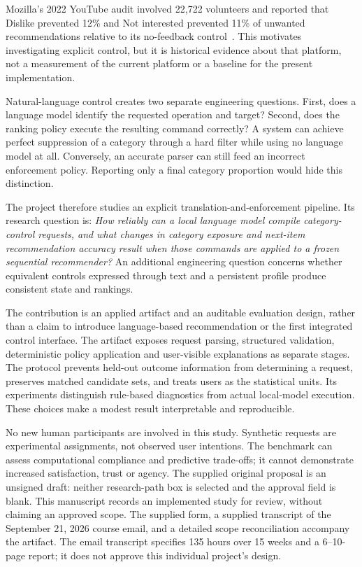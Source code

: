 \documentclass[conference]{IEEEtran}
\begin{document}
Mozilla's 2022 YouTube audit involved 22,722 volunteers and reported that Dislike prevented 12\% and Not interested prevented 11\% of unwanted recommendations relative to its no-feedback control~\cite{ricks2022button}. This motivates investigating explicit control, but it is historical evidence about that platform, not a measurement of the current platform or a baseline for the present implementation.

Natural-language control creates two separate engineering questions. First, does a language model identify the requested operation and target? Second, does the ranking policy execute the resulting command correctly? A system can achieve perfect suppression of a category through a hard filter while using no language model at all. Conversely, an accurate parser can still feed an incorrect enforcement policy. Reporting only a final category proportion would hide this distinction.

The project therefore studies an explicit translation-and-enforcement pipeline. Its research question is: \emph{How reliably can a local language model compile category-control requests, and what changes in category exposure and next-item recommendation accuracy result when those commands are applied to a frozen sequential recommender?} An additional engineering question concerns whether equivalent controls expressed through text and a persistent profile produce consistent state and rankings.

The contribution is an applied artifact and an auditable evaluation design, rather than a claim to introduce language-based recommendation or the first integrated control interface. The artifact exposes request parsing, structured validation, deterministic policy application and user-visible explanations as separate stages. The protocol prevents held-out outcome information from determining a request, preserves matched candidate sets, and treats users as the statistical units. Its experiments distinguish rule-based diagnostics from actual local-model execution. These choices make a modest result interpretable and reproducible.

No new human participants are involved in this study. Synthetic requests are experimental assignments, not observed user intentions. The benchmark can assess computational compliance and predictive trade-offs; it cannot demonstrate increased satisfaction, trust or agency. The supplied original proposal is an unsigned draft: neither research-path box is selected and the approval field is blank. This manuscript records an implemented study for review, without claiming an approved scope. The supplied form, a supplied transcript of the September 21, 2026 course email, and a detailed scope reconciliation accompany the artifact. The email transcript specifies 135 hours over 15 weeks and a 6--10-page report; it does not approve this individual project's design.
\end{document}
